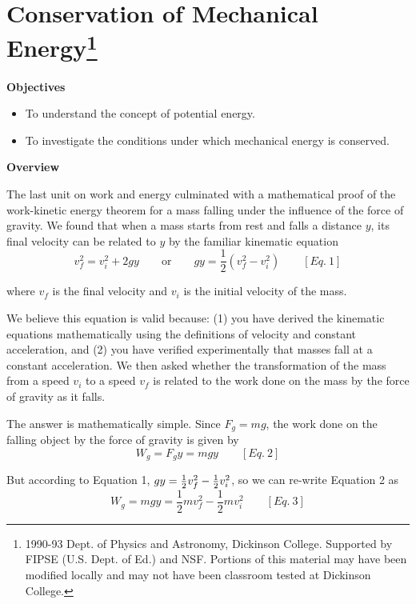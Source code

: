 
\section{Conservation of Mechanical Energy\footnote{
1990-93 Dept. of Physics and Astronomy, Dickinson College. Supported by FIPSE
(U.S. Dept. of Ed.) and NSF. Portions of this material may have been modified
locally and may not have been classroom tested at Dickinson College.
}}

\makelabheader %

\textbf{Objectives }

\begin{itemize}
\item To understand the concept of potential energy. 
\item To investigate the conditions under which mechanical energy is conserved.
\end{itemize}
\textbf{Overview }

The last unit on work and energy culminated with a mathematical proof of the
work-kinetic energy theorem for a mass falling under the influence of the 
force of gravity. We found that when a mass starts from rest and falls a 
distance $y$, its final velocity can be related to $y$ by the familiar 
kinematic equation
\[
v_{f}^{2}=v_{i}^{2}+2gy\qquad \mbox{or}
\qquad gy=\frac{1}{2}\left( v_{f}^{2}-v_{i}^{2}\right) \qquad [Eq.\: 1]\]


where \( v_{f} \) is the final velocity and \( v_{i} \) is the initial velocity
of the mass.

We believe this equation is valid because: (1) you have derived the kinematic
equations mathematically using the definitions of velocity and constant 
acceleration, and (2) you have verified experimentally that masses fall at a 
constant acceleration.
We then asked whether the transformation of the mass from a speed \( v_{i} \)
to a speed \( v_{f} \) is related to the work done on the mass by the force
of gravity as it falls.

The answer is mathematically simple. Since \( F_{g}=mg \), the work done
on the falling object by the force of gravity is given by
\[
W_{g}=F_{g}y=mgy\qquad [Eq.\: 2]\]


But according to Equation 1, \(gy = {1\over 2} v_{f}^{2} - {1\over 2} 
v_{i}^{2} \),
so we can re-write Equation 2 as
\[
W_{g}=mgy=\frac{1}{2}mv_{f}^{2}-\frac{1}{2}mv_{i}^{2}\qquad [Eq.\: 3]\]


